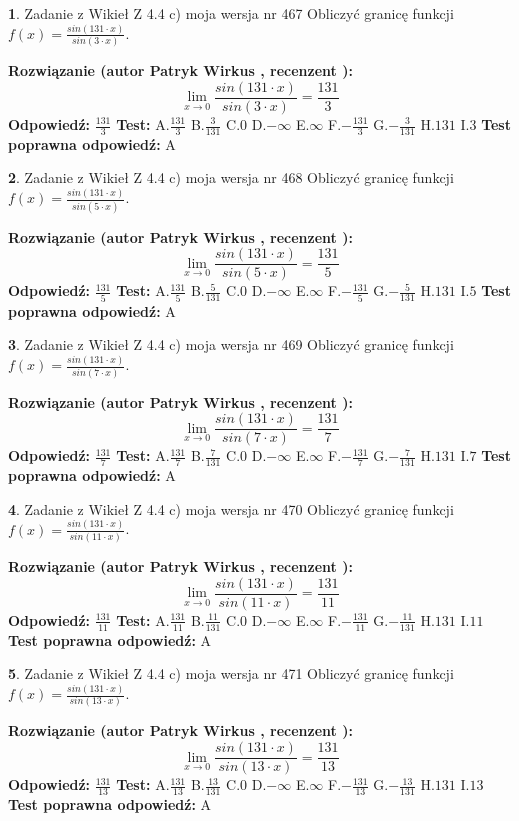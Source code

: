 \documentclass[12pt, a4paper]{article}
\theoremstyle{definition} %
\newtheorem{zad}{}
\newcommand{\zadStart}[1]{\begin{zad}#1\newline}
\newcommand{\zadStop}{\end{zad}}
\newcommand{\rozwStart}[2]{\noindent \textbf{Rozwiązanie (autor #1 , recenzent #2): }\newline}
\newcommand{\rozwStop}{\newline}
\newcommand{\odpStart}{\noindent \textbf{Odpowiedź:}\newline}
\newcommand{\odpStop}{\newline}
\newcommand{\testStart}{\noindent \textbf{Test:}\newline}
\newcommand{\testStop}{\newline}
\newcommand{\kluczStart}{\noindent \textbf{Test poprawna odpowiedź:}\newline}
\newcommand{\kluczStop}{\newline}
\begin{document}
\zadStart{Zadanie z Wikieł Z 4.4 c) moja wersja nr 467}
Obliczyć granicę funkcji $f(x)=\frac{sin(131\cdot x)}{sin(3\cdot x)}$.
\zadStop
\rozwStart{Patryk Wirkus}{}
$$\lim\limits_{x\to 0}\frac{sin(131\cdot x)}{sin(3\cdot x)}=
\frac{131}{3}$$
\rozwStop
\odpStart
$\frac{131}{3}$
\odpStop
\testStart
A.$\frac{131}{3}$
B.$\frac{3}{131}$
C.$0$
D.$-\infty$
E.$\infty$
F.$-\frac{131}{3}$
G.$-\frac{3}{131}$
H.$131$
I.$3$
\testStop
\kluczStart
A
\kluczStop



\zadStart{Zadanie z Wikieł Z 4.4 c) moja wersja nr 468}
Obliczyć granicę funkcji $f(x)=\frac{sin(131\cdot x)}{sin(5\cdot x)}$.
\zadStop
\rozwStart{Patryk Wirkus}{}
$$\lim\limits_{x\to 0}\frac{sin(131\cdot x)}{sin(5\cdot x)}=
\frac{131}{5}$$
\rozwStop
\odpStart
$\frac{131}{5}$
\odpStop
\testStart
A.$\frac{131}{5}$
B.$\frac{5}{131}$
C.$0$
D.$-\infty$
E.$\infty$
F.$-\frac{131}{5}$
G.$-\frac{5}{131}$
H.$131$
I.$5$
\testStop
\kluczStart
A
\kluczStop



\zadStart{Zadanie z Wikieł Z 4.4 c) moja wersja nr 469}
Obliczyć granicę funkcji $f(x)=\frac{sin(131\cdot x)}{sin(7\cdot x)}$.
\zadStop
\rozwStart{Patryk Wirkus}{}
$$\lim\limits_{x\to 0}\frac{sin(131\cdot x)}{sin(7\cdot x)}=
\frac{131}{7}$$
\rozwStop
\odpStart
$\frac{131}{7}$
\odpStop
\testStart
A.$\frac{131}{7}$
B.$\frac{7}{131}$
C.$0$
D.$-\infty$
E.$\infty$
F.$-\frac{131}{7}$
G.$-\frac{7}{131}$
H.$131$
I.$7$
\testStop
\kluczStart
A
\kluczStop



\zadStart{Zadanie z Wikieł Z 4.4 c) moja wersja nr 470}
Obliczyć granicę funkcji $f(x)=\frac{sin(131\cdot x)}{sin(11\cdot x)}$.
\zadStop
\rozwStart{Patryk Wirkus}{}
$$\lim\limits_{x\to 0}\frac{sin(131\cdot x)}{sin(11\cdot x)}=
\frac{131}{11}$$
\rozwStop
\odpStart
$\frac{131}{11}$
\odpStop
\testStart
A.$\frac{131}{11}$
B.$\frac{11}{131}$
C.$0$
D.$-\infty$
E.$\infty$
F.$-\frac{131}{11}$
G.$-\frac{11}{131}$
H.$131$
I.$11$
\testStop
\kluczStart
A
\kluczStop



\zadStart{Zadanie z Wikieł Z 4.4 c) moja wersja nr 471}
Obliczyć granicę funkcji $f(x)=\frac{sin(131\cdot x)}{sin(13\cdot x)}$.
\zadStop
\rozwStart{Patryk Wirkus}{}
$$\lim\limits_{x\to 0}\frac{sin(131\cdot x)}{sin(13\cdot x)}=
\frac{131}{13}$$
\rozwStop
\odpStart
$\frac{131}{13}$
\odpStop
\testStart
A.$\frac{131}{13}$
B.$\frac{13}{131}$
C.$0$
D.$-\infty$
E.$\infty$
F.$-\frac{131}{13}$
G.$-\frac{13}{131}$
H.$131$
I.$13$
\testStop
\kluczStart
A
\kluczStop
\end{document}
